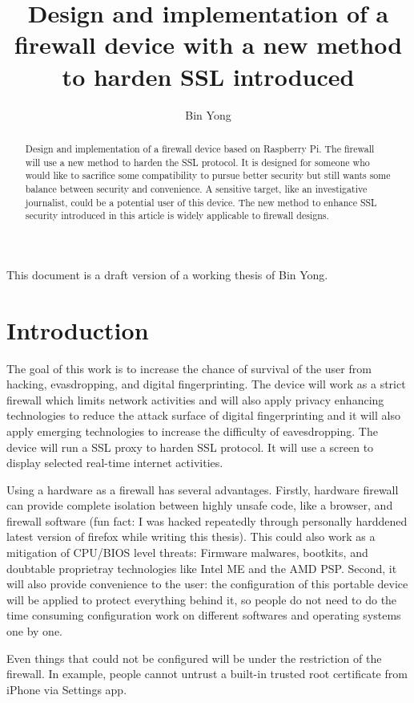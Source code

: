 \documentclass[mscthesis]{usiinfthesis}
\title{Design and implementation of a firewall device with a new method to harden SSL introduced} %
\author{Bin Yong} %
\begin{document}
\maketitle %

\frontmatter %

\begin{abstract}
  Design and implementation of a firewall device based on Raspberry Pi.
  The firewall will use a new method to harden the SSL protocol. It is
  designed for someone who would like to sacrifice some compatibility
  to pursue better security but still wants some balance between
  security and convenience. A sensitive target, like an investigative
  journalist, could be a potential user of this device. The new method
  to enhance SSL security introduced in this article is widely
  applicable to firewall designs.

\end{abstract}

\begin{acknowledgements}
  This document is a draft version of a working thesis of Bin Yong.
\end{acknowledgements}

\tableofcontents
\listoffigures %
\listoftables %

\mainmatter

\chapter{Introduction}
The goal of this work is to increase the chance of survival of the user from hacking, evasdropping, and digital fingerprinting. The device will work as a strict firewall which limits network activities and will also apply privacy enhancing technologies to reduce the attack surface of digital fingerprinting and it will also apply emerging technologies to
increase the difficulty of eavesdropping. The device will run a SSL proxy
to harden SSL protocol. It will use a screen to display selected real-time
internet activities.\par
Using a hardware as a firewall has several advantages. Firstly, hardware
firewall can provide complete isolation between highly unsafe code,
like a browser, and firewall software (fun fact: I was hacked repeatedly
through personally harddened latest version of firefox while writing this
thesis). This could also work as a mitigation of CPU/BIOS level threats:
Firmware malwares, bootkits, and doubtable proprietray technologies like
Intel ME and the AMD PSP. Second, it will also provide convenience to the
user: the configuration of this portable device will be applied to protect
everything behind it, so people do not need to do the time consuming
configuration work on different softwares and operating systems one by one. \par
Even things that could not be configured will be under the restriction of the firewall. In example, people cannot untrust a built-in trusted root certificate from iPhone via Settings app.
\end{document}
